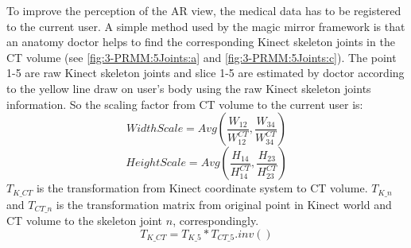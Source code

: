 To improve the perception of the AR view, the medical data has to be registered to the current user. A simple method used by the magic mirror framework is that an anatomy doctor helps to find the corresponding Kinect skeleton joints in the CT volume (see \figurename{\ref{fig:3-PRMM:5Joints:a}} and \figurename{\ref{fig:3-PRMM:5Joints:c}}). The point 1-5 are raw Kinect skeleton joints and slice 1-5 are estimated by doctor according to the yellow line draw on user's body using the raw Kinect skeleton joints information. So the scaling factor from CT volume to the current user is:
\begin{equation}
	WidthScale = Avg(\frac{{{W_{12}}}}{{W_{12}^{CT}}},\frac{{{W_{34}}}}{{W_{34}^{CT}}})
\end{equation}
\begin{equation}
	HeightScale = Avg(\frac{{{H_{14}}}}{{H_{14}^{CT}}},\frac{{{H_{23}}}}{{H_{23}^{CT}}})
\end{equation}
$T_{K\_CT}$ is the transformation from Kinect coordinate system to CT volume. $T_{K\_n}$ and $T_{CT\_n}$ is the transformation matrix from original point in Kinect world and CT volume to the skeleton joint $n$, correspondingly.
\begin{equation}
	T_{K\_CT} = T_{K\_5} * T_{CT\_5}.inv()
\end{equation}
